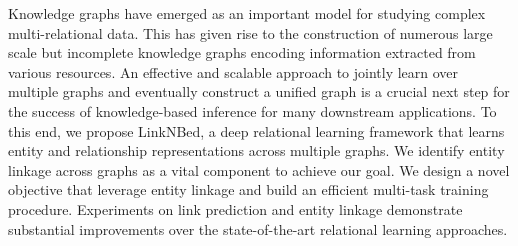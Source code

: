 Knowledge graphs have emerged as an important model for studying complex multi-relational data. This has given rise to the construction of numerous large scale but incomplete knowledge graphs encoding information extracted from various resources. An effective and scalable approach to jointly learn over multiple graphs and eventually construct a unified graph is a crucial next step for the success of knowledge-based inference for many downstream applications. To this end, we propose LinkNBed, a deep relational learning framework that learns entity and relationship representations across multiple graphs. We identify entity linkage across graphs as a vital component to achieve our goal. We design a novel objective that leverage entity linkage and build an efficient multi-task training procedure. Experiments on link prediction and entity linkage demonstrate substantial improvements over the state-of-the-art relational learning approaches.
